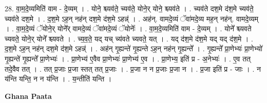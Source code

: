 \documentclass[17pt]{extarticle}
\begin{document}
28. वा॒म॒दे॒व्यमिति॑ वाम - दे॒व्यम् । . योने॒ श्च्यव॑ते॒ च्यव॑ते॒ योने॒र् योने॒ श्च्यव॑ते । . च्यव॑ते दश॒मे द॑श॒मे च्यव॑ते॒ च्यव॑ते दश॒मे । . द॒श॒मे ऽह॒न् नह॑न् दश॒मे द॑श॒मे ऽहन्न्॑ । . अह॑न्. वामदे॒व्यं ॅवा॑मदे॒व्य मह॒न् नह॑न्. वामदे॒व्यम् । . वा॒म॒दे॒व्यं ॅयोने॒र् योने᳚र् वामदे॒व्यं ॅवा॑मदे॒व्यं ॅयोनेः᳚ । . वा॒म॒दे॒व्यमिति॑ वाम - दे॒व्यम् । . योने᳚ श्च्यवते च्यवते॒ योने॒र् योने᳚ श्च्यवते । . च्य॒व॒ते॒ यद् यच् च्य॑वते च्यवते॒ यत् । . यद् द॑श॒मे द॑श॒मे यद् यद् द॑श॒मे । . द॒श॒मे ऽह॒न् नह॑न् दश॒मे द॑श॒मे ऽहन्न्॑ । . अह॑न् गृ॒ह्यन्ते॑ गृ॒ह्यन्ते ऽह॒न् नह॑न् गृ॒ह्यन्ते᳚ । . गृ॒ह्यन्ते᳚ प्रा॒णेभ्यः॑ प्रा॒णेभ्यो॑ गृ॒ह्यन्ते॑ गृ॒ह्यन्ते᳚ प्रा॒णेभ्यः॑ । . प्रा॒णेभ्य॑ ए॒वैव प्रा॒णेभ्यः॑ प्रा॒णेभ्य॑ ए॒व । . प्रा॒णेभ्य॒ इति॑ प्र - अ॒नेभ्यः॑ । . ए॒व तत् तदे॒वैव तत् । . तत् प्र॒जाः प्र॒जा स्तत् तत् प्र॒जाः । . प्र॒जा न न प्र॒जाः प्र॒जा न । . प्र॒जा इति॑ प्र - जाः । . न य॑न्ति यन्ति॒ न न य॑न्ति । . य॒न्तीति॑ यन्ति । \newline

\textbf{Ghana Paata } \newline
\end{document}
